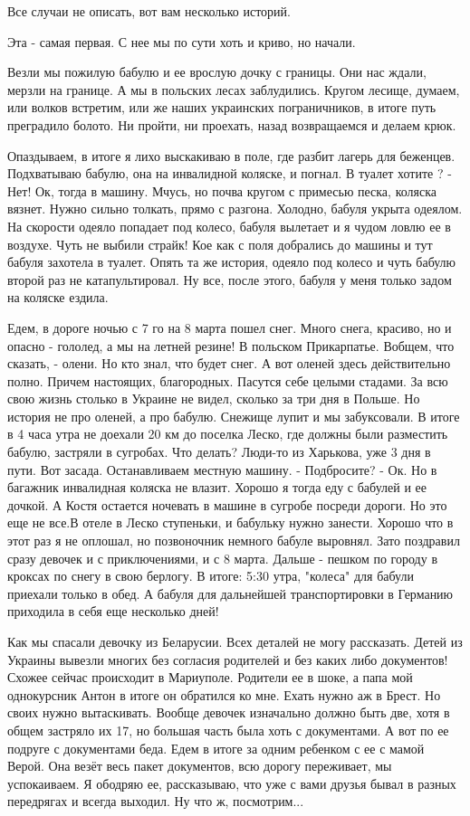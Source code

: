 Все случаи не описать, вот вам несколько историй. 

Эта - самая  первая. С нее  мы по сути хоть и криво, но начали.

Везли мы пожилую бабулю и ее врослую дочку с границы. Они нас ждали, мерзли на
границе. А мы в  польских лесах заблудились. Кругом лесище, думаем, или волков
встретим, или же наших украинских пограничников, в итоге путь преградило
болото. Ни пройти, ни проехать, назад возвращаемся и делаем крюк.

Опаздываем, в  итоге я лихо выскакиваю в поле, где разбит лагерь для беженцев.
Подхватываю бабулю, она на инвалидной коляске, и погнал. В туалет хотите ? -
Нет! Ок, тогда в машину. Мчусь, но почва кругом с примесью песка, коляска
вязнет. Нужно сильно толкать, прямо с разгона. Холодно,  бабуля  укрыта
одеялом. На скорости одеяло попадает под колесо, бабуля вылетает и я чудом
ловлю ее в воздухе. Чуть не выбили страйк! Кое как с поля добрались до машины
и тут  бабуля захотела в туалет. Опять та же история, одеяло под колесо и чуть
бабулю второй раз не катапультировал. Ну все, после этого, бабуля у меня
только задом на коляске ездила.

Едем, в  дороге ночью с 7 го на 8 марта пошел снег.  Много снега, красиво, но и
опасно - гололед, а мы на летней резине!  В  польском Прикарпатье. Вобщем, что
сказать, - олени. Но кто знал, что будет снег. А вот   оленей здесь
действительно полно. Причем настоящих, благородных. Пасутся себе целыми
стадами.  За всю свою жизнь столько в Украине не видел, сколько за три дня в
Польше. Но история не про оленей, а про бабулю. Снежище лупит и мы забуксовали.
В итоге в 4 часа утра не доехали 20 км до поселка Леско, где должны были
разместить бабулю, застряли в сугробах. Что делать? Люди-то из Харькова, уже 3
дня в пути. Вот засада. Останавливаем местную машину. - Подбросите? - Ок. Но в
багажник инвалидная коляска не влазит. Хорошо я тогда еду с бабулей  и ее
дочкой. А Костя остается  ночевать в машине в сугробе посреди дороги. Но это
еще не все.В отеле в Леско ступеньки, и бабульку нужно занести. Хорошо что в
этот раз я не оплошал, но позвоночник немного бабуле выровнял. Зато поздравил
сразу девочек и с приключениями, и с 8 марта.  Дальше - пешком по городу в
кроксах по снегу в свою берлогу.  В итоге: 5:30 утра, "колеса" для бабули
приехали только в обед. А бабуля для дальнейшей транспортировки  в Германию
приходила в себя еще несколько дней! 

Как мы спасали девочку из Беларусии. Всех деталей не могу рассказать. Детей из
Украины вывезли многих без согласия родителей и без каких либо документов!
Схожее сейчас происходит в Мариуполе. Родители ее в шоке, а папа мой
однокурсник Антон в итоге он обратился ко мне. Ехать нужно аж в Брест. Но своих
нужно вытаскивать. Вообще девочек изначально  должно быть две, хотя в общем
застряло их 17,  но большая часть была хоть с документами.  А вот по ее подруге
с документами беда.  Едем в итоге  за  одним ребенком с ее с мамой Верой.  Она
везёт весь пакет документов, всю дорогу переживает, мы успокаиваем.  Я ободряю
ее, рассказываю, что  уже с вами друзья  бывал в разных передрягах и всегда
выходил. Ну что ж, посмотрим...

